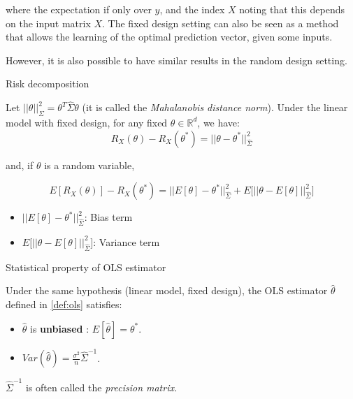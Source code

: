 \documentclass[
10pt, %
a4paper, %
oneside, %
headinclude,footinclude, %
BCOR5mm, %
]{scrartcl}
\begin{document}
where the expectation if only over $y$, and the index $X$ noting that this depends on the input matrix $X$. The fixed design setting can also be seen as a method that allows the learning of the optimal prediction vector, given some inputs.

However, it is also possible to have similar results in the random design setting.

\begin{proposition}{Risk decomposition}

    Let $||\theta||_{\Sigma}^2 = \theta^T\hat{\Sigma} \theta$ (it is called the \textit{{Mahalanobis distance norm}}).  Under the linear model with fixed design, for any fixed $\theta \in \mathbb{R}^d$, we have:
    \begin{equation}
	R_X(\theta)-R_X( \theta^*) = ||\theta-\theta^*||_{\hat{\Sigma}}^2
    \end{equation}

    and, if $\theta$ is a random variable,

    \begin{equation}
	E[R_X(\theta)]-R_X(\theta^*) = ||E[\theta]-\theta^*||_{\hat{\Sigma}}^2+E\Big[||\theta-E[\theta]||_{\hat{\Sigma}}^2\Big]
    \end{equation}
    \begin{itemize}
	\item $||E[\theta]-\theta^*||_{\hat{\Sigma}}^2$: Bias term
	\item $E\Big[||\theta-E[\theta]||_{\hat{\Sigma}}^2\Big]$: Variance term
    \end{itemize}
\end{proposition}

\begin{proposition}{Statistical property of OLS estimator}

    Under the same hypothesis (linear model, fixed design), the OLS estimator $ \hat{\theta}$ defined in \ref{def:ols} satisfies:

    \begin{itemize}
	\item $ \hat{\theta}$ is \textbf{{unbiased}} : $ E[ \hat{\theta}] = \theta^*$.
	\item $ Var( \hat{\theta}) = \frac{\sigma^2}{n} \hat{\Sigma}^{-1}$.
    \end{itemize}
\end{proposition}
    

$ \hat{\Sigma}^{-1}$ is often called the \textit{{precision matrix.}} 
\end{document}
